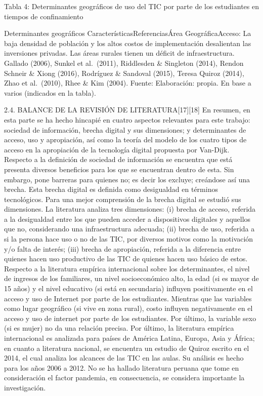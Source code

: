 Tabla 4: Determinantes geográficos de uso del TIC por parte de los
estudiantes en tiempos de confinamiento

Determinantes geográficos CaracterísticasReferenciasÁrea
GeográficaAcceso: La baja densidad de población y los altos costos de
implementación desalientan las inversiones privadas. Las áreas rurales
tienen un déficit de infraestructura. Gallado (2006), Sunkel et
al.~(2011), Riddlesden \& Singleton (2014), Rendon Schneir \& Xiong
(2016), Rodríguez \& Sandoval (2015), Teresa Quiroz (2014), Zhao et
al.~(2010), Rhee \& Kim (2004). Fuente: Elaboración: propia. En base a
varios (indicados en la tabla).

2.4. BALANCE DE LA REVISIÓN DE LITERATURA{[}17{]}{[}18{]} En resumen, en
esta parte se ha hecho hincapié en cuatro aspectos relevantes para este
trabajo: sociedad de información, brecha digital y sus dimensiones; y
determinantes de acceso, uso y apropiación, así como la teoría del
modelo de los cuatro tipos de acceso en la apropiación de la tecnología
digital propuesta por Van-Dijk. Respecto a la definición de sociedad de
información se encuentra que está presenta diversos beneficios para los
que se encuentran dentro de esta. Sin embargo, pone barreras para
quienes no; es decir los excluye; creándose así una brecha. Esta brecha
digital es definida como desigualdad en términos tecnológicos. Para una
mejor comprensión de la brecha digital se estudió sus dimensiones. La
literatura analiza tres dimensiones: (i) brecha de acceso, referida a la
desigualdad entre los que pueden acceder a dispositivos digitales y
aquellos que no, considerando una infraestructura adecuada; (ii) brecha
de uso, referida a si la persona hace uso o no de las TIC, por diversos
motivos como la motivación y/o falta de interés; (iii) brecha de
apropiación, referida a la diferencia entre quienes hacen uso productivo
de las TIC de quienes hacen uso básico de estos. Respecto a la
literatura empírica internacional sobre los determinantes, el nivel de
ingresos de los familiares, un nivel socioeconómico alto, la edad (si es
mayor de 15 años) y el nivel educativo (si está en secundaria) influyen
positivamente en el acceso y uso de Internet por parte de los
estudiantes. Mientras que las variables como lugar geográfico (si vive
en zona rural), costo influyen negativamente en el acceso y uso de
internet por parte de los estudiantes. Por último, la variable sexo (si
es mujer) no da una relación precisa. Por último, la literatura empírica
internacional es analizada para países de América Latina, Europa, Asia y
África; en cuanto a literatura nacional, se encuentra un estudio de
Quiroz escrito en el 2014, el cual analiza los alcances de las TIC en
las aulas. Su análisis es hecho para los años 2006 a 2012. No se ha
hallado literatura peruana que tome en consideración el factor pandemia,
en consecuencia, se considera importante la investigación.

